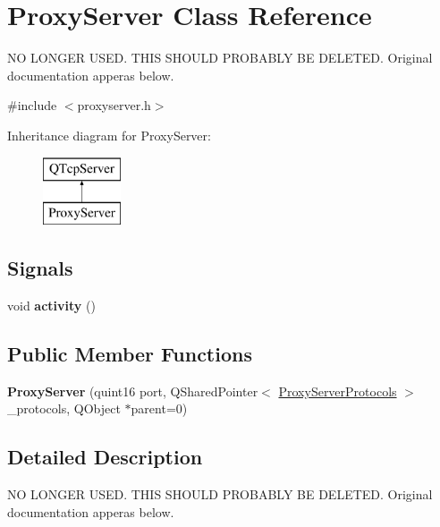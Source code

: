 \hypertarget{class_proxy_server}{\section{Proxy\-Server Class Reference}
\label{class_proxy_server}
}


N\-O L\-O\-N\-G\-E\-R U\-S\-E\-D. T\-H\-I\-S S\-H\-O\-U\-L\-D P\-R\-O\-B\-A\-B\-L\-Y B\-E D\-E\-L\-E\-T\-E\-D. Original documentation apperas below.  




{\ttfamily \#include $<$proxyserver.\-h$>$}

Inheritance diagram for Proxy\-Server\-:\begin{figure}[H]
\begin{center}
\leavevmode
\includegraphics[height=2.000000cm]{class_proxy_server}
\end{center}
\end{figure}
\subsection*{Signals}
\begin{DoxyCompactItemize}
\item 
\hypertarget{class_proxy_server_ae7ea49a9fc2a795ae4e4f50109ff4fa5}{void {\bfseries activity} ()}\label{class_proxy_server_ae7ea49a9fc2a795ae4e4f50109ff4fa5}

\end{DoxyCompactItemize}
\subsection*{Public Member Functions}
\begin{DoxyCompactItemize}
\item 
\hypertarget{class_proxy_server_a84d815d7dff499ecaff9522c05c373bf}{{\bfseries Proxy\-Server} (quint16 port, Q\-Shared\-Pointer$<$ \hyperlink{struct_proxy_server_protocols}{Proxy\-Server\-Protocols} $>$ \-\_\-protocols, Q\-Object $\ast$parent=0)}\label{class_proxy_server_a84d815d7dff499ecaff9522c05c373bf}

\end{DoxyCompactItemize}


\subsection{Detailed Description}
N\-O L\-O\-N\-G\-E\-R U\-S\-E\-D. T\-H\-I\-S S\-H\-O\-U\-L\-D P\-R\-O\-B\-A\-B\-L\-Y B\-E D\-E\-L\-E\-T\-E\-D. Original documentation apperas below. 

